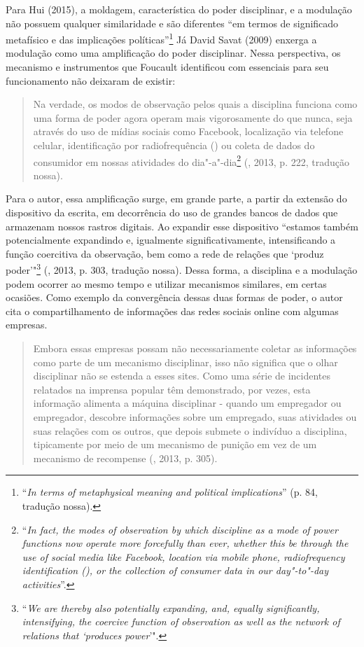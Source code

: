 Para Hui (2015), a moldagem, característica do poder disciplinar, e a modulação não
possuem qualquer similaridade e são diferentes ``em termos de
significado metafísico e das implicações políticas''\footnote{``\emph{In terms
  of metaphysical meaning and political implications}'' (p. 84, tradução
nossa).} Já David Savat (2009) enxerga a modulação como uma amplificação do poder disciplinar. Nessa perspectiva, os mecanismo e instrumentos que Foucault identificou com
essenciais para seu funcionamento não deixaram de existir:

\begin{quote}
Na verdade, os modos de observação pelos quais a disciplina funciona
como uma forma de poder agora operam mais vigorosamente do que nunca,
seja através do uso de mídias sociais como Facebook, localização  via
telefone celular, identificação por radiofrequência () ou coleta de
dados do consumidor em nossas atividades do dia"-a"-dia\footnote{``\emph{In
  fact, the modes of observation by which discipline as a mode of power
  functions now operate more forcefully than ever, whether this be
  through the use of social media like Facebook,  location via mobile
  phone, radiofrequency identification (), or the collection of
  consumer data in our day"-to"-day activities}''.} (, 2013, p. 222, tradução nossa). 
\end{quote}

Para o autor, essa amplificação surge, em grande parte, a partir da
extensão do dispositivo da escrita, em decorrência do uso de grandes
bancos de dados que armazenam nossos rastros digitais. Ao expandir esse
dispositivo ``estamos também potencialmente expandindo e, igualmente
significativamente, intensificando a função coercitiva da observação,
bem como a rede de relações que `produz poder'"\footnote{``\emph{We are
  thereby also potentially expanding, and, equally significantly,
  intensifying, the coercive function of observation as well as the
  network of relations that `produces power}'".}
(, 2013, p. 303, tradução nossa).
Dessa forma, a disciplina e a modulação podem ocorrer ao mesmo tempo e
utilizar mecanismos similares, em certas ocasiões. Como exemplo da
convergência dessas duas formas de poder, o autor cita o
compartilhamento de informações das redes sociais online com algumas
empresas.

\begin{quote}
Embora essas empresas possam não necessariamente coletar as informações
como parte de um mecanismo disciplinar, isso não significa que o olhar
disciplinar não se estenda a esses sites. Como uma série de incidentes
relatados na imprensa popular têm demonstrado, por vezes, esta
informação alimenta a máquina disciplinar - quando um empregador ou
empregador, descobre informações sobre um empregado, suas atividades ou
suas relações com os outros, que depois submete o indivíduo a
disciplina, tipicamente por meio de um mecanismo de punição em vez de um
mecanismo de recompense (, 2013, p. 305).
\end{quote}

